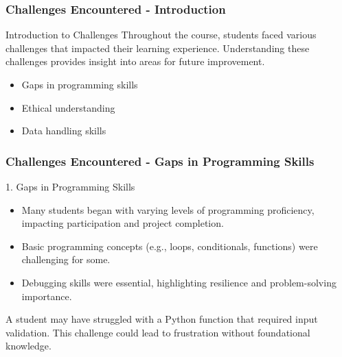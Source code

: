 \documentclass[aspectratio=169]{beamer}
\begin{document}
\begin{frame}[fragile]
    \frametitle{Challenges Encountered - Introduction}
    \begin{block}{Introduction to Challenges}
        Throughout the course, students faced various challenges that impacted their learning experience. Understanding these challenges provides insight into areas for future improvement.
    \end{block}
    \begin{itemize}
        \item Gaps in programming skills
        \item Ethical understanding
        \item Data handling skills
    \end{itemize}
\end{frame}

\begin{frame}[fragile]
    \frametitle{Challenges Encountered - Gaps in Programming Skills}
    \begin{block}{1. Gaps in Programming Skills}
        \begin{itemize}
            \item Many students began with varying levels of programming proficiency, impacting participation and project completion.
            \item Basic programming concepts (e.g., loops, conditionals, functions) were challenging for some.
            \item Debugging skills were essential, highlighting resilience and problem-solving importance.
        \end{itemize}
    \end{block}
    \begin{example}
        A student may have struggled with a Python function that required input validation. This challenge could lead to frustration without foundational knowledge.
    \end{example}
\end{frame}
\end{document}
